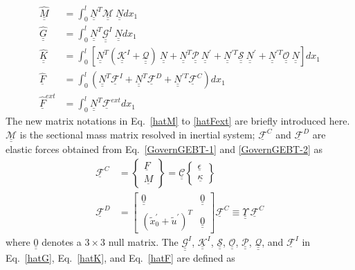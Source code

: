 \documentclass{aiaa-tc}
\newcommand{\tens}[1]{\underline{\underline{#1}}}
\renewcommand{\vec}[1]{\underline{#1}}
\begin{document}
\begin{align}
	\label{hatM} 
	\hat{\tens{M}}&= \int_0^l \underline{\underline{N}}^T \mathcal{\underline{\underline{M}}} ~\underline{\underline{N}} dx_1 \\
	\label{hatG}
	\hat{\tens{G}} &= \int_0^l \tens{N}^T \tens{\mathcal{G}}^I~\tens{N} dx_1\\ 
	\label{hatK}
	\hat{\tens{K}}&=\int_0^l \left[ \tens{N}^T (\tens{\mathcal{K}}^I + \mathcal{\tens{Q}})~ \tens{N} + \tens{N}^T \mathcal{\tens{P}}~ \tens{N}^\prime + \tens{N}^{\prime T} \mathcal{\tens{S}}~ \tens{N}^\prime + \tens{N}^{\prime T} \mathcal{\tens{O}}~ \tens{N} \right] d x_1 \\	
	\label{hatF}
	\hat{\vec{F}} &= \int_0^l (\tens{N}^T \vec{\mathcal{F}}^I + \tens{N}^T \mathcal{\vec{F}}^D + \tens{N}^{\prime T} \mathcal{\vec{F}}^C)dx_1 \\
	\label{hatFext}
	\hat{\vec{F}}^{ext}& = \int_0^l \tens{N}^T \mathcal{\vec{F}}^{ext} dx_1 
\end{align}
The new matrix notations in Eq.~\eqref{hatM} to \eqref{hatFext} are briefly introduced here. $\mathcal{\tens{M}}$ is the sectional mass matrix resolved in inertial system; $\mathcal{\vec{F}}^C$ and $\mathcal{\vec{F}}^D$ are elastic forces obtained from Eq.~\eqref{GovernGEBT-1} and \eqref{GovernGEBT-2} as
\begin{align}
	\label{FC}
	\mathcal{\vec{F}}^C &= \begin{Bmatrix}
         \vec{F} \\
	\vec{M}
	\end{Bmatrix} = \tens{\mathcal{C}} \begin{Bmatrix}
	\vec{\epsilon} \\
	\vec{\kappa}
	\end{Bmatrix} \\
	\label{FD}
	\mathcal{\vec{F}}^D & = \begin{bmatrix}
	\underline{\underline{0}} & \underline{\underline{0}}\\
	(\tilde{x}_0^\prime+\tilde{u}^\prime)^T & \underline{\underline{0}}
	\end{bmatrix}
	\mathcal{\vec{F}}^C \equiv \tens{\Upsilon}~ \mathcal{\vec{F}}^C
\end{align}
where $\underline{\underline{0}}$ denotes a $3 \times 3$ null matrix. The $\tens{\mathcal{G}}^I$, $\tens{\mathcal{K}}^I$, $\mathcal{\tens{S}}$, $\mathcal{\tens{O}}$, $\mathcal{\tens{P}}$, $\mathcal{\tens{Q}}$, and $\vec{\mathcal{F}}^I$ in Eq.~\eqref{hatG}, Eq.~\eqref{hatK}, and Eq.~\eqref{hatF} are defined as
\end{document}
